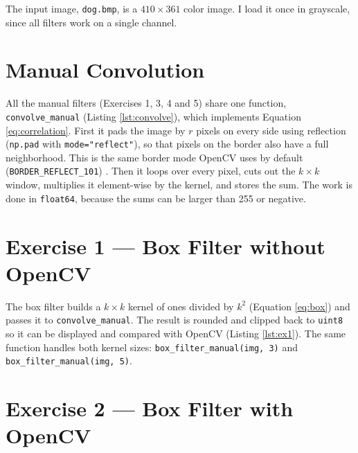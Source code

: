 The input image, \texttt{dog.bmp}, is a $410 \times 361$ color image. I
load it once in grayscale, since all filters work on a single channel.


\section{Manual Convolution}
\label{sec:convolve}

All the manual filters (Exercises 1, 3, 4 and 5) share one function,
\texttt{convolve\_manual} (Listing \ref{lst:convolve}), which implements
Equation \ref{eq:correlation}. First it pads the image by $r$ pixels on
every side using reflection (\texttt{np.pad} with
\texttt{mode="reflect"}), so that pixels on the border also have a full
neighborhood. This is the same border mode OpenCV uses by default
(\texttt{BORDER\_REFLECT\_101}) \citep{opencvfilters}. Then it loops over
every pixel, cuts out the $k \times k$ window, multiplies it element-wise
by the kernel, and stores the sum. The work is done in
\texttt{float64}, because the sums can be larger than 255 or negative.




\section{Exercise 1 --- Box Filter without OpenCV}
\label{sec:ex1}

The box filter builds a $k \times k$ kernel of ones divided by $k^2$
(Equation \ref{eq:box}) and passes it to \texttt{convolve\_manual}. The
result is rounded and clipped back to \texttt{uint8} so it can be
displayed and compared with OpenCV (Listing \ref{lst:ex1}). The same
function handles both kernel sizes: \texttt{box\_filter\_manual(img, 3)}
and \texttt{box\_filter\_manual(img, 5)}.




\section{Exercise 2 --- Box Filter with OpenCV}
\label{sec:ex2}

